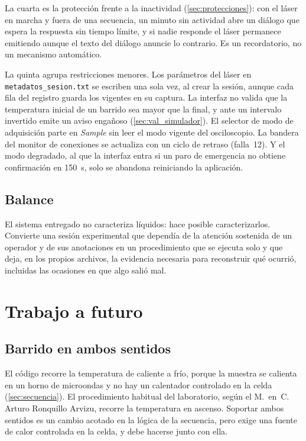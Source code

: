 La cuarta es la protección frente a la inactividad
(\cref{sec:protecciones}): con el láser en marcha y fuera de una
secuencia, un minuto sin actividad abre un diálogo que espera la
respuesta sin tiempo límite, y si nadie responde el láser permanece
emitiendo aunque el texto del diálogo anuncie lo contrario. Es un
recordatorio, no un mecanismo automático.

La quinta agrupa restricciones menores. Los parámetros del láser en
\texttt{metadatos\_\allowbreak{}sesion.txt} se escriben una sola vez, al crear la
sesión, aunque cada fila del registro guarda los vigentes en su
captura. La interfaz no valida que la temperatura inicial de un barrido
sea mayor que la final, y ante un intervalo invertido emite un aviso
engañoso (\cref{sec:val_simulador}). El selector de modo de
adquisición parte en \textit{Sample} sin leer el modo vigente del
osciloscopio. La bandera del monitor de conexiones se actualiza con un
ciclo de retraso (falla~12). Y el modo degradado, al que la interfaz
entra si un paro de emergencia no obtiene confirmación en
\SI{150}{\second}, solo se abandona reiniciando la aplicación.

\subsection*{Balance}

El sistema entregado no caracteriza líquidos: hace posible
caracterizarlos. Convierte una sesión experimental que dependía de la
atención sostenida de un operador y de sus anotaciones en un
procedimiento que se ejecuta solo y que deja, en los propios archivos,
la evidencia necesaria para reconstruir qué ocurrió, incluidas las
ocasiones en que algo salió mal.

\section{Trabajo a futuro}
\label{sec:trabajo_futuro}

\subsection*{Barrido en ambos sentidos}

El código recorre la temperatura de caliente a frío, porque la muestra
se calienta en un horno de microondas y no hay un calentador controlado
en la celda (\cref{sec:secuencia}). El procedimiento habitual del
laboratorio, según el M.~en~C. Arturo Ronquillo Arvizu, recorre la
temperatura en ascenso. Soportar ambos sentidos es un cambio acotado en
la lógica de la secuencia, pero exige una fuente de calor controlada en
la celda, y debe hacerse junto con ella.

